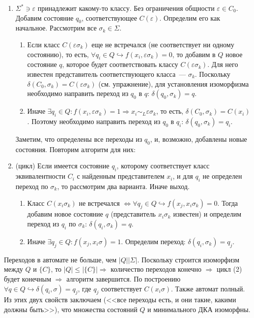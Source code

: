 \documentclass[a4paper]{article}
\begin{document}
\begin{enumerate}
\item $\Sigma^*\ni\varepsilon$ принадлежит какому-то классу. Без ограничения общности $\varepsilon\in C_0$. Добавим состояние $q_0$, соответствующее $C(\varepsilon)$. Определим его как начальное.\newline
Рассмотрим все $\sigma_k\in\Sigma$.\begin{enumerate}[1.]
\item Если класс $C(\varepsilon\sigma_k)$ еще не встречался (не соответствует ни одному состоянию), то есть, $\forall q_i\in Q\hookrightarrow f(x_i,\varepsilon\sigma_k)=0$, то добавим в $Q$ новое состояние $q$, которое будет соответствовать классу $C(\varepsilon\sigma_k)$. Для него известен представитель соответствующего класса~--- $\sigma_k$. Поскольку $\delta(C_0,\sigma_k)=C(\varepsilon\sigma_k)$ (см. упражнение), для установления изоморфизма необходимо направить переход из $q_0$ в $q$: $\delta(q_0,\sigma_k)=q$.
\item Иначе $\exists q_i\in Q\colon f(x_i,\varepsilon\sigma_k)=1\Rightarrow x_i\sim_L\varepsilon\sigma_k$, то есть, $\delta(C_0,\sigma_k)=C(x_i)$. Поэтому необходимо направить переход из $q_0$ в $q_i$: $\delta(q_0,\sigma_k)=q_i$.
\end{enumerate}
Заметим, что определены все переходы из $q_0$, и, возможно, добавлены новые состояния. Повторим алгоритм для них:
\item (цикл) Если имеется состояние $q_i$, которому соответствует класс эквивалентности $C_i$ с найденным представителем $x_i$, и для $q_i$ не определен переход по $\sigma_k$, то рассмотрим два варианта. Иначе выход.
\begin{enumerate}[1.]
\item Класс $C(x_i\sigma_k)$ не встречался $\Leftrightarrow \forall q_j\in Q\hookrightarrow f(x_j,x_i\sigma_k)=0$. Тогда добавим новое состояние $q$ (представитель $x_i\sigma_k$ известен) и определим переход из $q_i$ по $\sigma_k$: $\delta(q_i,\sigma_k)=q$.
\item Иначе $\exists q_j\in Q\colon f(x_j,x_i\sigma)=1$. Определим переход: $\delta(q_i,\sigma_k)=q_j$.
\end{enumerate}
\end{enumerate}
Переходов в автомате не больше, чем $|Q||\Sigma|$. Поскольку строится изоморфизм между $Q$ и $\{C\}$, то $|Q|\leqslant|\{C\}|\Rightarrow$ количество переходов конечно $\Rightarrow$ цикл (2) будет конечным $\Rightarrow$ алгоритм завершится. По построению $\forall q\in Q\hookrightarrow \delta(q_i,\sigma)=q_j$, где $q_j$ соответствует $C(x_i\sigma)$. Также автомат полный. Из этих двух свойств заключаем (<<все переходы есть, и они такие, какими должны быть>>), что множества состояний $Q$ и минимального ДКА изоморфны.\newline
\end{document}
